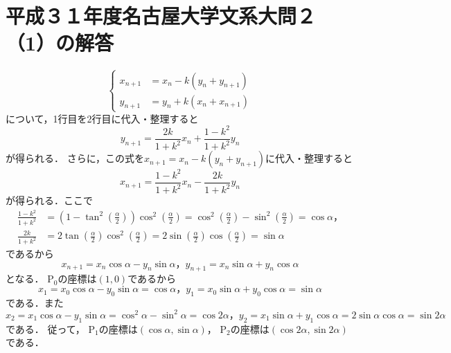 \documentclass[../main]{subfiles}
\begin{document}
\section*{平成３１年度名古屋大学文系大問２（1）の解答}
\[
\begin{cases}
x_{n+1}&=x_n-k(y_n+y_{n+1}) \\
y_{n+1}&=y_n+k(x_n+x_{n+1})
\end{cases}
\]
について，1行目を2行目に代入・整理すると
\[
y_{n+1}=\frac{2k}{1+k^2}x_n+\frac{1-k^2}{1+k^2}y_n
\]
が得られる．
さらに，この式を$x_{n+1}=x_n-k(y_n+y_{n+1})$に代入・整理すると
\[
x_{n+1}=\frac{1-k^2}{1+k^2}x_n-\frac{2k}{1+k^2}y_n
\]
が得られる．ここで
\begin{align*}
\frac{1-k^2}{1+k^2}
&=(1-\tan^2(\frac{\alpha}{2}))\cos^2(\frac{\alpha}{2})
=\cos^2(\frac{\alpha}{2})-\sin^2(\frac{\alpha}{2})
=\cos\alpha，\\
\frac{2k}{1+k^2}
&=2\tan(\frac{\alpha}{2})\cos^2(\frac{\alpha}{2})
=2\sin(\frac{\alpha}{2})\cos(\frac{\alpha}{2})
=\sin\alpha
\end{align*}
であるから
\[
x_{n+1}=x_n\cos\alpha-y_n\sin\alpha，
y_{n+1}=x_n\sin\alpha+y_n\cos\alpha
\]
となる．
$\mathrm{P}_0$の座標は$(1,0)$であるから
\[
x_1=x_0\cos\alpha-y_0\sin\alpha=\cos\alpha，
y_1=x_0\sin\alpha+y_0\cos\alpha=\sin\alpha
\]
である．また
\[
x_2=x_1\cos\alpha-y_1\sin\alpha=\cos^2\alpha-\sin^2\alpha=\cos2\alpha，
y_2=x_1\sin\alpha+y_1\cos\alpha=2\sin\alpha\cos\alpha=\sin2\alpha
\]
である．
従って，
$\mathrm{P}_1$の座標は$(\cos\alpha,\sin\alpha)$，
$\mathrm{P}_2$の座標は$(\cos2\alpha,\sin2\alpha)$
である．
\end{document}

